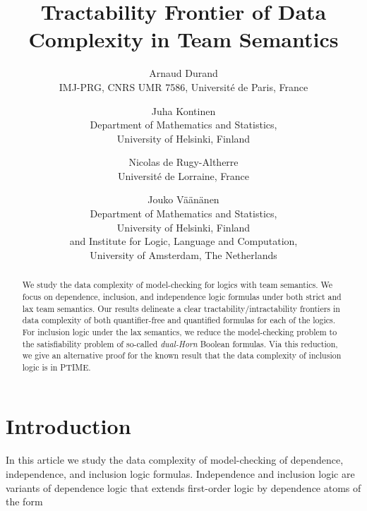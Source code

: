 \documentclass{article}
\theoremstyle{plain}
\theoremstyle{definition}
\begin{document}
\title{Tractability Frontier of Data Complexity in Team Semantics}

\author{Arnaud Durand\\
IMJ-PRG, CNRS UMR 7586, Universit\'e de Paris, France

\and

Juha Kontinen\\
Department of Mathematics and Statistics,\\
 University of Helsinki, Finland

\and Nicolas de Rugy-Altherre\\
Universit\'e de Lorraine, France

\and
Jouko V\"{a}\"{a}n\"{a}nen\\
Department of Mathematics and Statistics,\\
 University of Helsinki, Finland\\
and
Institute for Logic, Language and Computation,\\
 University of Amsterdam, The Netherlands}
\date{}



\maketitle





\begin{abstract}We study the data complexity of model-checking for logics with team semantics. We focus on dependence, inclusion, and independence logic formulas under both strict and lax team semantics. Our results delineate a clear tractability/intractability frontiers in data complexity of both quantifier-free and quantified formulas for each of the logics. 
For inclusion logic under the lax semantics, we reduce the model-checking problem to the satisfiability problem of so-called \emph{dual-Horn} Boolean formulas. Via this reduction, we give an alternative proof for the known result that the data complexity of inclusion logic is in  PTIME.
\end{abstract}

\section{Introduction}

In this article we study the data complexity of model-checking of dependence, independence, and inclusion logic formulas. Independence  and inclusion logic  \cite{gradel10,galliani12} are variants of  dependence logic \cite{vaananen07}  that  extends first-order logic by dependence atoms of the form 
\end{document}
